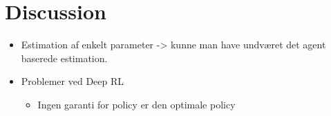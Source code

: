 \section{Discussion}

\begin{itemize}
    \item Estimation af enkelt parameter -> kunne man have undværet det agent baserede estimation.
    \item Problemer ved Deep RL
    \begin{itemize}
        \item Ingen garanti for policy er den optimale policy
    \end{itemize}
\end{itemize}